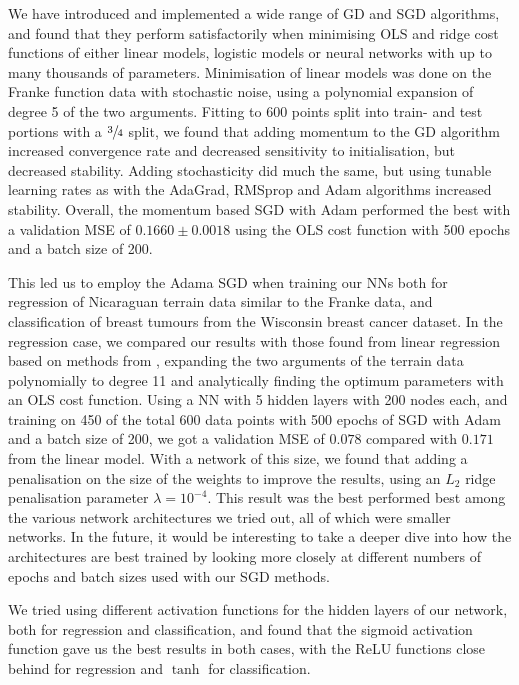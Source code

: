 We have introduced and implemented a wide range of GD and SGD algorithms, and found that they perform satisfactorily when minimising OLS and ridge cost functions of either linear models, logistic models or neural networks with up to many thousands of parameters. Minimisation of linear models was done on the Franke function data with stochastic noise, using a polynomial expansion of degree 5 of the two arguments. Fitting to 600 points split into train- and test portions with a $\sfrac{3}{4}$ split, we found that adding momentum to the GD algorithm increased convergence rate and decreased sensitivity to initialisation, but decreased stability. Adding stochasticity did much the same, but using tunable learning rates as with the AdaGrad, RMSprop and Adam algorithms increased stability. Overall, the momentum based SGD with Adam performed the best with a validation MSE of $0.1660 \pm 0.0018$ using the OLS cost function with 500 epochs and a batch size of 200.

This led us to employ the Adama SGD when training our NNs both for regression of Nicaraguan terrain data similar to the Franke data, and classification of breast tumours from the Wisconsin breast cancer dataset. In the regression case, we compared our results with those found from linear regression based on methods from \cite{Project1}, expanding the two arguments of the terrain data polynomially to degree 11 and analytically finding the optimum parameters with an OLS cost function. Using a NN with 5 hidden layers with 200 nodes each, and training on 450 of the total 600 data points with 500 epochs of SGD with Adam and a batch size of 200, we got a validation MSE of $0.078$ compared with $0.171$ from the linear model. With a network of this size, we found that adding a penalisation on the size of the weights to improve the results, using an $L_2$ ridge penalisation parameter $\lambda = 10^{-4}$. This result was the best performed best among the various network architectures we tried out, all of which were smaller networks. In the future, it would be interesting to take a deeper dive into how the architectures are best trained by looking more closely at different numbers of epochs and batch sizes used with our SGD methods.

We tried using different activation functions for the hidden layers of our network, both for regression and classification, and found that the sigmoid activation function gave us the best results in both cases, with the ReLU functions close behind for regression and $\tanh$ for classification. 

